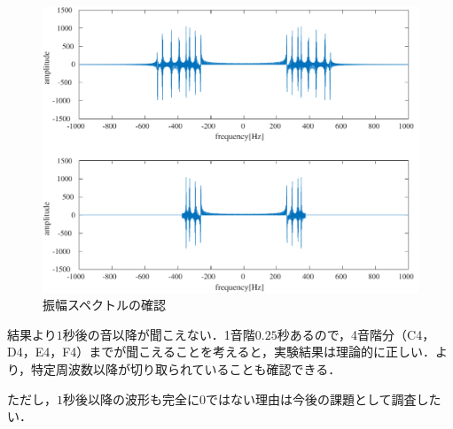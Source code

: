 \begin{figure}[h]
    \begin{minipage}[b]{.3\textwidth}
        \centering
        \includegraphics[keepaspectratio,width=\textwidth]{../../Figures/02_21.pdf}
        \caption{振幅スペクトルの確認}
        \label{fig:振幅スペクトルの確認}
    \end{minipage}
\end{figure}
\consideration
結果より\(1\)秒後の音以降が聞こえない．1音階\(0.25\)秒あるので，4音階分（C4，D4，E4，F4）までが聞こえることを考えると，実験結果は理論的に正しい．より，特定周波数以降が切り取られていることも確認できる．\par
ただし，\(1\)秒後以降の波形も完全に0ではない理由は今後の課題として調査したい．
